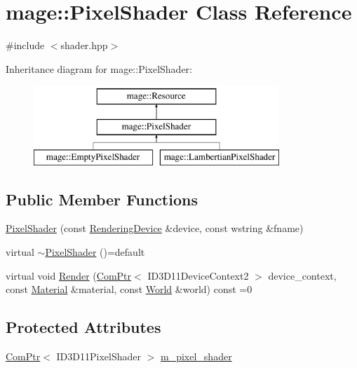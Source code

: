\hypertarget{classmage_1_1_pixel_shader}{}\section{mage\+:\+:Pixel\+Shader Class Reference}
\label{classmage_1_1_pixel_shader}


{\ttfamily \#include $<$shader.\+hpp$>$}

Inheritance diagram for mage\+:\+:Pixel\+Shader\+:\begin{figure}[H]
\begin{center}
\leavevmode
\includegraphics[height=3.000000cm]{classmage_1_1_pixel_shader}
\end{center}
\end{figure}
\subsection*{Public Member Functions}
\begin{DoxyCompactItemize}
\item 
\hyperlink{classmage_1_1_pixel_shader_a9a31af122003b6672ded3912f29109df}{Pixel\+Shader} (const \hyperlink{classmage_1_1_rendering_device}{Rendering\+Device} \&device, const wstring \&fname)
\item 
virtual \hyperlink{classmage_1_1_pixel_shader_ac339b9196db24d18143ad36013d598b2}{$\sim$\+Pixel\+Shader} ()=default
\item 
virtual void \hyperlink{classmage_1_1_pixel_shader_a2e47b753e60dc05cf2cc9d4acb87c343}{Render} (\hyperlink{namespacemage_ae74f374780900893caa5555d1031fd79}{Com\+Ptr}$<$ I\+D3\+D11\+Device\+Context2 $>$ device\+\_\+context, const \hyperlink{structmage_1_1_material}{Material} \&material, const \hyperlink{classmage_1_1_world}{World} \&world) const =0
\end{DoxyCompactItemize}
\subsection*{Protected Attributes}
\begin{DoxyCompactItemize}
\item 
\hyperlink{namespacemage_ae74f374780900893caa5555d1031fd79}{Com\+Ptr}$<$ I\+D3\+D11\+Pixel\+Shader $>$ \hyperlink{classmage_1_1_pixel_shader_a1dd0f87be1c1f7fe5a1bb2737263222f}{m\+\_\+pixel\+\_\+shader}
\end{DoxyCompactItemize}
